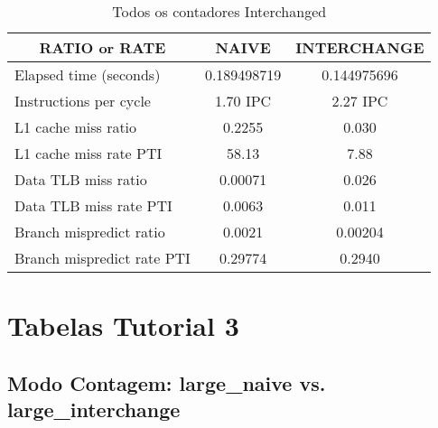 \documentclass[11pt, oneside]{article}   	%
\begin{document}
\begin{table}[h!]
\centering
\label{table:ratios}
\begin{tabular}{|l|c|c|}
\hline
\multicolumn{1}{|c|}{\textbf{RATIO or RATE}} & \textbf{NAIVE} & \textbf{INTERCHANGE} \\ \hline
Elapsed time (seconds)                    & 0.189498719    & 0.144975696          \\ \hline
Instructions per cycle                    & 1.70 IPC       & 2.27 IPC             \\ \hline
L1 cache miss ratio                       & 0.2255         & 0.030                \\ \hline
L1 cache miss rate PTI                    & 58.13          & 7.88                 \\ \hline
Data TLB miss ratio                       & 0.00071        & 0.026                \\ \hline
Data TLB miss rate PTI                    & 0.0063         & 0.011                \\ \hline
Branch mispredict ratio                   & 0.0021         & 0.00204              \\ \hline
Branch mispredict rate PTI                & 0.29774        & 0.2940               \\ \hline
\end{tabular}
\caption{Todos os contadores Interchanged}
\end{table}

\section{Tabelas Tutorial 3}

\subsection{Modo Contagem: large\_naive vs. large\_interchange}
\end{document}
